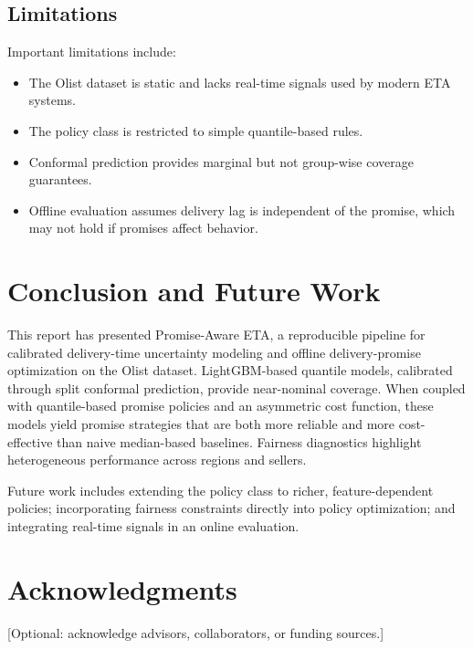 \documentclass[10pt,twocolumn]{article}
\begin{document}
\subsection{Limitations}
Important limitations include:
\begin{itemize}
  \item The Olist dataset is static and lacks real-time signals used by modern ETA systems.
  \item The policy class is restricted to simple quantile-based rules.
  \item Conformal prediction provides marginal but not group-wise coverage guarantees.
  \item Offline evaluation assumes delivery lag is independent of the promise, which may not hold if promises affect behavior.
\end{itemize}

\section{Conclusion and Future Work}
This report has presented Promise-Aware ETA, a reproducible pipeline for calibrated delivery-time uncertainty modeling and offline delivery-promise optimization on the Olist dataset. LightGBM-based quantile models, calibrated through split conformal prediction, provide near-nominal coverage. When coupled with quantile-based promise policies and an asymmetric cost function, these models yield promise strategies that are both more reliable and more cost-effective than naive median-based baselines. Fairness diagnostics highlight heterogeneous performance across regions and sellers.

Future work includes extending the policy class to richer, feature-dependent policies; incorporating fairness constraints directly into policy optimization; and integrating real-time signals in an online evaluation.

\section*{Acknowledgments}
[Optional: acknowledge advisors, collaborators, or funding sources.]
\end{document}

